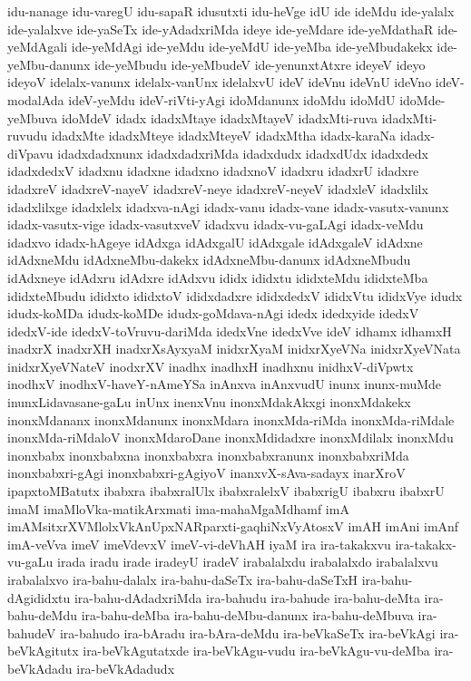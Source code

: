{idu-nanage
idu-varegU
idu-sapaR
idusutxti
idu-heVge
idU
ide
ideMdu
ide-yalalx
ide-yalalxve
ide-yaSeTx
ide-yAdadxriMda
ideye
ide-yeMdare
ide-yeMdathaR
ide-yeMdAgali
ide-yeMdAgi
ide-yeMdu
ide-yeMdU
ide-yeMba
ide-yeMbudakekx
ide-yeMbu-danunx
ide-yeMbudu
ide-yeMbudeV
ide-yenunxtAtxre
ideyeV
ideyo
ideyoV
idelalx-vanunx
idelalx-vanUnx
idelalxvU
ideV
ideVnu
ideVnU
ideVno
ideV-modalAda
ideV-yeMdu
ideV-riVti-yAgi
idoMdanunx
idoMdu
idoMdU
idoMde-yeMbuva
idoMdeV
idadx
idadxMtaye
idadxMtayeV
idadxMti-ruva
idadxMti-ruvudu
idadxMte
idadxMteye
idadxMteyeV
idadxMtha
idadx-karaNa
idadx-diVpavu
idadxdadxnunx
idadxdadxriMda
idadxdudx
idadxdUdx
idadxdedx
idadxdedxV
idadxnu
idadxne
idadxno
idadxnoV
idadxru
idadxrU
idadxre
idadxreV
idadxreV-nayeV
idadxreV-neye
idadxreV-neyeV
idadxleV
idadxlilx
idadxlilxge
idadxlelx
idadxva-nAgi
idadx-vanu
idadx-vane
idadx-vasutx-vanunx
idadx-vasutx-vige
idadx-vasutxveV
idadxvu
idadx-vu-gaLAgi
idadx-veMdu
idadxvo
idadx-hAgeye
idAdxga
idAdxgalU
idAdxgale
idAdxgaleV
idAdxne
idAdxneMdu
idAdxneMbu-dakekx
idAdxneMbu-danunx
idAdxneMbudu
idAdxneye
idAdxru
idAdxre
idAdxvu
ididx
ididxtu
ididxteMdu
ididxteMba
ididxteMbudu
ididxto
ididxtoV
ididxdadxre
ididxdedxV
ididxVtu
ididxVye
idudx
idudx-koMDa
idudx-koMDe
idudx-goMdava-nAgi
idedx
idedxyide
idedxV
idedxV-ide
idedxV-toVruvu-dariMda
idedxVne
idedxVve
ideV
idhamx
idhamxH
inadxrX
inadxrXH
inadxrXsAyxyaM
inidxrXyaM
inidxrXyeVNa
inidxrXyeVNata
inidxrXyeVNateV
inodxrXV
inadhx
inadhxH
inadhxnu
inidhxV-diVpwtx
inodhxV
inodhxV-haveY-nAmeYSa
inAnxva
inAnxvudU
inunx
inunx-muMde
inunxLidavasane-gaLu
inUnx
inenxVnu
inonxMdakAkxgi
inonxMdakekx
inonxMdananx
inonxMdanunx
inonxMdara
inonxMda-riMda
inonxMda-riMdale
inonxMda-riMdaloV
inonxMdaroDane
inonxMdidadxre
inonxMdilalx
inonxMdu
inonxbabx
inonxbabxna
inonxbabxra
inonxbabxranunx
inonxbabxriMda
inonxbabxri-gAgi
inonxbabxri-gAgiyoV
inanxvX-sAva-sadayx
inarXroV
ipapxtoMBatutx
ibabxra
ibabxralUlx
ibabxralelxV
ibabxrigU
ibabxru
ibabxrU
imaM
imaMloVka-matikArxmati
ima-mahaMgaMdhamf
imA
imAMsitxrXVMlolxVkAnUpxNARparxti-gaqhiNxVyAtosxV
imAH
imAni
imAnf
imA-veVva
imeV
imeVdevxV
imeV-vi-deVhAH
iyaM
ira
ira-takakxvu
ira-takakx-vu-gaLu
irada
iradu
irade
iradeyU
iradeV
irabalalxdu
irabalalxdo
irabalalxvu
irabalalxvo
ira-bahu-dalalx
ira-bahu-daSeTx
ira-bahu-daSeTxH
ira-bahu-dAgididxtu
ira-bahu-dAdadxriMda
ira-bahudu
ira-bahude
ira-bahu-deMta
ira-bahu-deMdu
ira-bahu-deMba
ira-bahu-deMbu-danunx
ira-bahu-deMbuva
ira-bahudeV
ira-bahudo
ira-bAradu
ira-bAra-deMdu
ira-beVkaSeTx
ira-beVkAgi
ira-beVkAgitutx
ira-beVkAgutatxde
ira-beVkAgu-vudu
ira-beVkAgu-vu-deMba
ira-beVkAdadu
ira-beVkAdadudx
}

